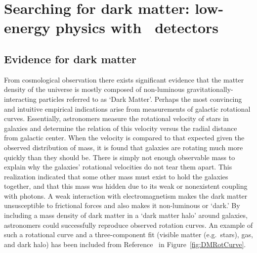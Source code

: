 

	\section{Searching for dark matter: low-energy physics with \ppc~detectors}
	
		\subsection{Evidence for dark matter}
	From cosmological observation there exists significant evidence that the matter density of the universe is mostly composed of non-luminous gravitationally-interacting particles referred to as `Dark Matter'.  Perhaps the most convincing and intuitive empirical indications arise from measurements of galactic rotational curves.  Essentially, astronomers measure the rotational velocity of stars in galaxies and determine the relation of this velocity versus the radial distance from galactic center.  When the velocity is compared to that expected given the observed distribution of mass, it is found that galaxies are rotating much more quickly than they should be.  There is simply not enough observable mass to explain why the galaxies' rotational velocities do not tear them apart.  This realization indicated that some other mass must exist to hold the galaxies together, and that this mass was hidden due to its weak or nonexistent coupling with photons.  A weak interaction with electromagnetism makes the dark matter unsusceptible to frictional forces and also makes it non-luminous or `dark.'  By including a mass density of dark matter in a `dark matter halo' around galaxies, astronomers could successfully reproduce observed rotation curves.  An example of such a rotational curve and a three-component fit (visible matter (e.g.~stars), gas, and dark halo) has been included from Reference~\cite{Begeman:1991iy} in Figure~\ref{fig:DMRotCurve}.

